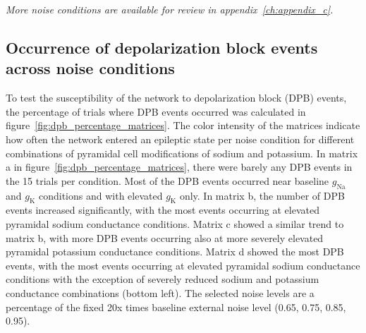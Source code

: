 \noindent
\textit{More noise conditions are available for review in appendix~\ref{ch:appendix_c}.}

\subsection{Occurrence of depolarization block events across noise conditions}
To test the susceptibility of the network to depolarization block (DPB) events, the percentage of trials where DPB events occurred was calculated in figure~\ref{fig:dpb_percentage_matrices}.
The color intensity of the matrices indicate how often the network entered an epileptic state per noise condition for different combinations of pyramidal cell modifications of sodium and potassium.
In matrix a in figure~\ref{fig:dpb_percentage_matrices}, there were barely any DPB events in the 15 trials per condition. Most of the DPB events occurred near baseline \(g_{\text{Na}}\) and \(g_{\text{K}}\) conditions and with elevated \(g_{\text{K}}\) only.
In matrix b, the number of DPB events increased significantly, with the most events occurring at elevated pyramidal sodium conductance conditions.
Matrix c showed a similar trend to matrix b, with more DPB events occurring also at more severely elevated pyramidal potassium conductance conditions.
Matrix d showed the most DPB events, with the most events occurring at elevated pyramidal sodium conductance conditions with the exception of severely reduced sodium and potassium conductance combinations (bottom left).
The selected noise levels are a percentage of the fixed 20x times baseline external noise level (0.65, 0.75, 0.85, 0.95).

